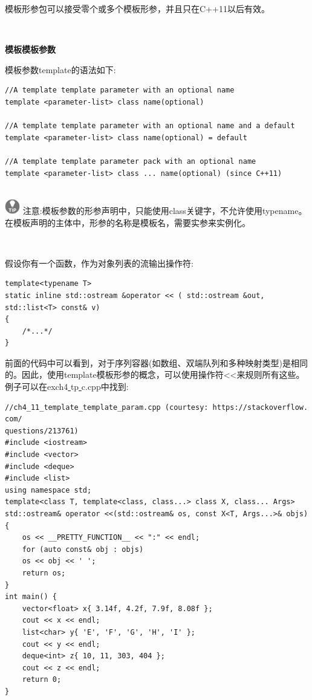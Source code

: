 模板形参包可以接受零个或多个模板形参，并且只在C++11以后有效。 \par

\noindent\textbf{}\ \par
\textbf{模板模板参数} \ \par
模板参数template的语法如下: \par

\begin{lstlisting}[caption={}]
//A template template parameter with an optional name
template <parameter-list> class name(optional)

//A template template parameter with an optional name and a default
template <parameter-list> class name(optional) = default

//A template template parameter pack with an optional name
template <parameter-list> class ... name(optional) (since C++11)
\end{lstlisting}

\hspace*{\fill} \\ %
\includegraphics[width=0.05\textwidth]{images/tip}
注意:模板参数的形参声明中，只能使用class关键字，不允许使用typename。在模板声明的主体中，形参的名称是模板名，需要实参来实例化。\par
\noindent\textbf{}\ \par

假设你有一个函数，作为对象列表的流输出操作符: \par

\begin{lstlisting}[caption={}]
template<typename T>
static inline std::ostream &operator << ( std::ostream &out,
std::list<T> const& v)
{
	/*...*/
}
\end{lstlisting}

前面的代码中可以看到，对于序列容器(如数组、双端队列和多种映射类型)是相同的。因此，使用template模板形参的概念，可以使用操作符<<来规则所有这些。例子可以在exch4\underline{ }tp\underline{ }c.cpp中找到:\par

\begin{lstlisting}[caption={}]
//ch4_11_template_template_param.cpp (courtesy: https:/​/​stackoverflow.​com/
questions/​213761)
#include <iostream>
#include <vector>
#include <deque>
#include <list>
using namespace std;
template<class T, template<class, class...> class X, class... Args>
std::ostream& operator <<(std::ostream& os, const X<T, Args...>& objs) {
	os << __PRETTY_FUNCTION__ << ":" << endl;
	for (auto const& obj : objs)
	os << obj << ' ';
	return os;
}
int main() {
	vector<float> x{ 3.14f, 4.2f, 7.9f, 8.08f };
	cout << x << endl;
	list<char> y{ 'E', 'F', 'G', 'H', 'I' };
	cout << y << endl;
	deque<int> z{ 10, 11, 303, 404 };
	cout << z << endl;
	return 0;
}
\end{lstlisting}

